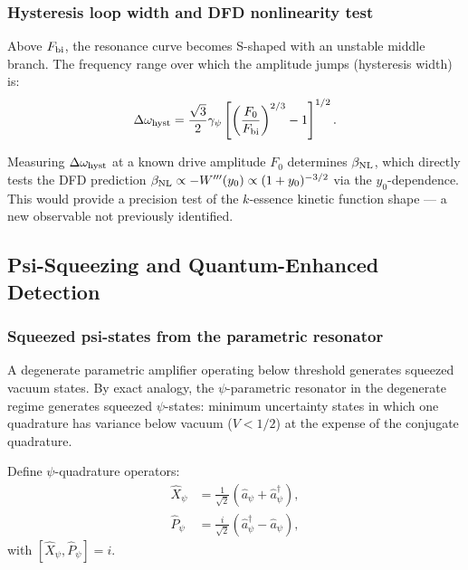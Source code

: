 \documentclass[11pt,twocolumn]{article}
\newcommand{\gpsi}{\gamma_\psi}
\begin{document}
\subsubsection{Hysteresis loop width and DFD nonlinearity test}

Above $F_{\rm bi}$, the resonance curve becomes S-shaped with an
unstable middle branch. The frequency range over which the amplitude
jumps (hysteresis width) is:
\begin{equation}
\Delta\omega_{\rm hyst} = \frac{\sqrt{3}}{2}\gpsi
\left[\left(\frac{F_0}{F_{\rm bi}}\right)^{2/3} - 1\right]^{1/2}.
\label{eq:hysteresis_width}
\end{equation}

Measuring $\Delta\omega_{\rm hyst}$ at a known drive amplitude $F_0$
determines $\beta_{\rm NL}$, which directly tests the DFD prediction
$\beta_{\rm NL} \propto -W'''(y_0) \propto (1+y_0)^{-3/2}$ via
the $y_0$-dependence. This would provide a precision test of the
$k$-essence kinetic function shape --- a new observable not previously
identified.

\subsection{Psi-Squeezing and Quantum-Enhanced Detection}
\label{sec:squeezing}

\subsubsection{Squeezed psi-states from the parametric resonator}

A degenerate parametric amplifier operating below threshold generates
squeezed vacuum states. By exact analogy, the $\psi$-parametric
resonator in the degenerate regime generates squeezed $\psi$-states:
minimum uncertainty states in which one quadrature has variance
below vacuum ($V < 1/2$) at the expense of the conjugate quadrature.

Define $\psi$-quadrature operators:
\begin{align}
\hat{X}_\psi &= \frac{1}{\sqrt{2}}(\hat{a}_\psi + \hat{a}_\psi^\dagger),\\
\hat{P}_\psi &= \frac{i}{\sqrt{2}}(\hat{a}_\psi^\dagger - \hat{a}_\psi),
\end{align}
with $[\hat{X}_\psi, \hat{P}_\psi] = i$.
\end{document}
